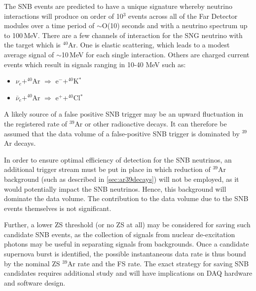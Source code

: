 The SNB events are predicted to have a unique signature whereby
neutrino interactions will produce on order of 10$^3$ events across
all of the Far Detector modules over a time period of $\sim$O(10) seconds and with a
neutrino spectrum up to 100\,MeV. There are a few channels of interaction
for the SNG neutrino with the target which is $^{40}$Ar. One is elastic
scattering, which  leads to a modest average signal of $\sim$10\,MeV for
each single interaction. Others are charged current events which result in signals
ranging in 10-40 MeV such as:
\begin{itemize}

\item $\nu_e+^{40}$Ar $\Rightarrow$ e$^-$+$^{40}$K$^*$

\item $\bar{\nu}_e+^{40}$Ar $\Rightarrow$ e$^+$+$^{40}$Cl$^*$

\end{itemize}

A likely source of a false positive SNB trigger may be an upward
fluctuation in the registered rate of $^{39}$Ar or other radioactive decays.
It can therefore be assumed that the data volume of a
false-positive SNB trigger is dominated by $^{39}$Ar decays.

In order to ensure optimal efficiency of detection for the SNB neutrinos,
an  additional trigger stream must be put in place in which
reduction of $^{39}$Ar background (such as described in \ref{sec:ar39decays}) will not be employed,
as it would potentially impact the SNB neutrinos. Hence, this background 
will dominate the data volume. The contribution to the data volume due to the SNB events
themselves is not significant.

Further, a lower ZS threshold (or no ZS at all) may be considered for saving such candidate SNB events, as the
collection of signals from nuclear de-excitation photons may be useful in separating signals from backgrounds.
Once a candidate supernova burst is identified, the possible instantaneous data rate is thus bound by the nominal
ZS $^{39}$Ar rate and the FS rate. The exact strategy for saving SNB candidates requires additional study
and will have implications on DAQ hardware and software design.

